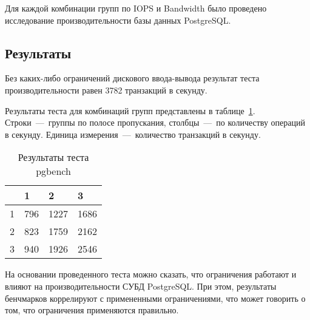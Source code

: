 Для каждой комбинации групп по IOPS и Bandwidth было проведено исследование производительности базы данных PostgreSQL.

\subsection{Результаты}

Без каких-либо ограничений дискового ввода-вывода результат теста производительности равен 3782 транзакций в секунду.

Результаты теста для комбинаций групп представлены в таблице~\ref{tab:results}. Строки~---~группы по полосе пропускания, столбцы~---~по количеству операций в секунду. Единица измерения~---~количество транзакций в секунду.

\begin{table}[H]
\caption{Результаты теста pgbench}
\label{tab:results}
\begin{tabular}{|l|l|l|l|}
\hline
  & 1   & 2    & 3    \\ \hline
1 & 796 & 1227 & 1686 \\ \hline
2 & 823 & 1759 & 2162 \\ \hline
3 & 940 & 1926 & 2546 \\ \hline
\end{tabular}
\end{table}

На основании проведенного теста можно сказать, что ограничения работают и влияют на производительности СУБД PostgreSQL.
    При этом, результаты бенчмарков коррелируют с примененными ограничениями, что может говорить о том, что ограничения применяются правильно. 